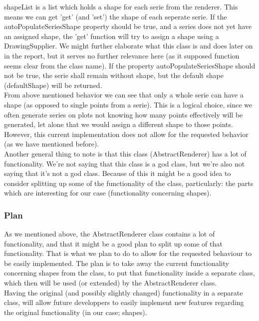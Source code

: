 \documentclass{article}
\begin{document}
shapeList is a list which holds a shape for each serie from the renderer.
This means we can get 'get' (and 'set') the shape of each seperate serie. If the autoPopulateSeriesShape property should be true, and a series does not yet have an assigned shape, the 'get' function will try to assign a shape using a DrawingSupplier. We might further elaborate what this class is and does later on in the report, but it serves no further relevance here (as it supposed function seems clear from the class name). If the property autoPopulateSeriesShape should not be true, the serie shall remain without shape, but the default shape (defaultShape) will be returned.\\ 

From above mentioned behavior we can see that only a whole serie can have a shape (as opposed to single points from a serie). This is a logical choice, since we often generate series on plots not knowing how many points effectively will be generated, let alone that we would assign a different shape to those points. However, this current implementation does not allow for the requested behavior (as we have mentioned before).\\

Another general thing to note is that this class (AbstractRenderer) has a lot of functionality. We're not saying that this class is a god class, but we're also not saying that it's not a god class. Because of this it might be a good idea to consider splitting up some of the functionality of the class, particularly: the parts which are interesting for our case (functionality concerning shapes).

\subsubsection{Plan}

As we mentioned above, the AbstractRenderer class contains a lot of functionality, and that it might be a good plan to split up some of that functionality. That is what we plan to do to allow for the requested behaviour to be easily implemented. The plan is to take away the current functionality concerning shapes from the class, to put that functionality inside a separate class, which then will be used (or extended) by the AbstractRenderer class.\\ 

Having the original (and possibly slightly changed) functionality in a separate class, will allow future developpers to easily implement new features regarding the original functionality (in our case; shapes).
\end{document}
